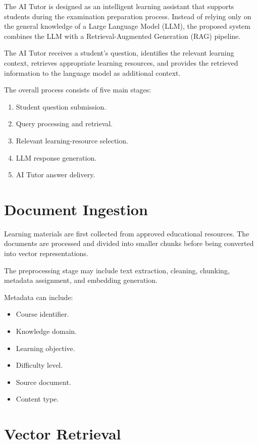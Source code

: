 \documentclass[12pt,a4paper]{report}
\begin{document}
The AI Tutor is designed as an intelligent learning assistant
that supports students during the examination preparation process.
Instead of relying only on the general knowledge of a Large Language
Model (LLM), the proposed system combines the LLM with a
Retrieval-Augmented Generation (RAG) pipeline.

The AI Tutor receives a student's question, identifies the relevant
learning context, retrieves appropriate learning resources, and
provides the retrieved information to the language model as
additional context.

The overall process consists of five main stages:

\begin{enumerate}
	\item Student question submission.
	\item Query processing and retrieval.
	\item Relevant learning-resource selection.
	\item LLM response generation.
	\item AI Tutor answer delivery.
\end{enumerate}

\section{Document Ingestion}

Learning materials are first collected from approved educational
resources. The documents are processed and divided into smaller
chunks before being converted into vector representations.

The preprocessing stage may include text extraction, cleaning,
chunking, metadata assignment, and embedding generation.

Metadata can include:

\begin{itemize}
	\item Course identifier.
	\item Knowledge domain.
	\item Learning objective.
	\item Difficulty level.
	\item Source document.
	\item Content type.
\end{itemize}

\section{Vector Retrieval}
\end{document}
